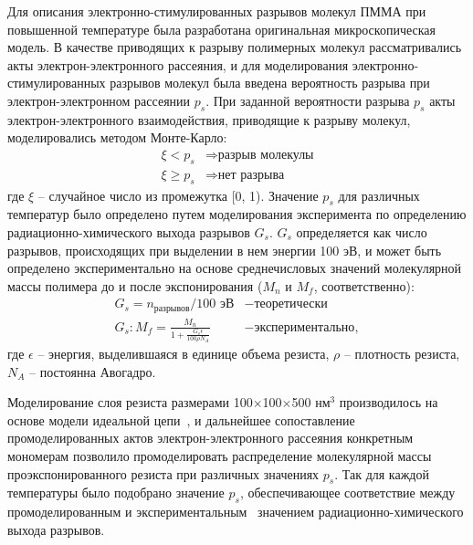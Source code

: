 Для описания электронно-стимулированных разрывов молекул ПММА при повышенной температуре была разработана оригинальная микроскопическая модель. В качестве приводящих к разрыву полимерных молекул рассматривались акты электрон-электронного рассеяния, и для моделирования электронно-стимулированных разрывов молекул была введена вероятность разрыва при электрон-электронном рассеянии $p_s$. При заданной вероятности разрыва $p_s$ акты электрон-электронного взаимодействия, приводящие к разрыву молекул, моделировались методом Монте-Карло:
\begin{equation} \label{eq:MC_9}
	\begin{aligned}
		\xi < p_s & \Rightarrow \text{разрыв молекулы} \\
		\xi \geq p_s & \Rightarrow \text{нет разрыва}
	\end{aligned}
\end{equation}
где $\xi$ -- случайное число из промежутка [0, 1). Значение $p_s$ для различных температур было определено путем моделирования эксперимента по определению радиационно-химического выхода разрывов $G_s$. $G_s$ определяется как число разрывов,  происходящих при выделении в нем энергии 100 эВ, и может быть определено экспериментально на основе среднечисловых значений молекулярной массы полимера до и после экспонирования ($M_n$ и $M_f$, соответственно):
\begin{equation}
	\begin{aligned}
		G_s = n_{\text{разрывов}} / 100 \text{ эВ} & - \text{теоретически} \\
		G_s: M_f = \frac{\displaystyle M_n}{1 + \frac{\displaystyle G_s \epsilon}{\displaystyle 100 \rho N_A}}& - \text{экспериментально},
	\end{aligned}
\end{equation}
где $\epsilon$ -- энергия, выделившаяся в единице объема резиста, $\rho$ -- плотность резиста, $N_A$  -- постоянна Авогадро.

Моделирование слоя резиста размерами 100$\times$100$\times$500 нм$^3$ производилось на основе модели идеальной цепи~\cite{Han_2002}, и дальнейшее сопоставление промоделированных актов электрон-электронного рассеяния конкретным мономерам позволило промоделировать распределение молекулярной массы проэкспонированного резиста при различных значениях $p_s$. Так для каждой температуры было подобрано значение $p_s$, обеспечивающее соответствие между промоделированным и экспериментальным~\cite{Charlesby_1964_Gs} значением радиационно-химического выхода разрывов.

